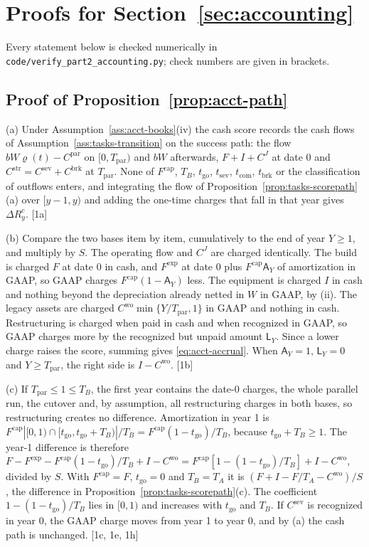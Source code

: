 \section{Proofs for Section~\ref{sec:accounting}}\label{app:proofs-accounting}

Every statement below is checked numerically in \texttt{code/verify\_part2\_accounting.py}; check numbers are given in brackets.

\subsection*{Proof of Proposition~\ref{prop:acct-path}}

(a) Under Assumption~\ref{ass:acct-books}(iv) the cash score records the cash flows of Assumption~\ref{ass:tasks-transition} on the success path: the flow $bW\varrho(t)-C^{\mathrm{par}}$ on $[0,T_{\mathrm{par}})$ and $bW$ afterwards, $F+I+C^J$ at date 0 and $C^{\mathrm{str}}=C^{\mathrm{sev}}+C^{\mathrm{brk}}$ at $T_{\mathrm{par}}$. None of $F^{\mathrm{cap}}$, $T_B$, $t_{\mathrm{go}}$, $t_{\mathrm{sev}}$, $t_{\mathrm{com}}$, $t_{\mathrm{brk}}$ or the classification of outflows enters, and integrating the flow of Proposition~\ref{prop:tasks-scorepath}(a) over $[y-1,y)$ and adding the one-time charges that fall in that year gives $\Delta R^c_y$. [1a]

(b) Compare the two bases item by item, cumulatively to the end of year $Y\ge 1$, and multiply by $S$. The operating flow and $C^J$ are charged identically. The build is charged $F$ at date 0 in cash, and $F^{\mathrm{exp}}$ at date 0 plus $F^{\mathrm{cap}}\mathsf A_Y$ of amortization in GAAP, so GAAP charges $F^{\mathrm{cap}}(1-\mathsf A_Y)$ less. The equipment is charged $I$ in cash and nothing beyond the depreciation already netted in $W$ in GAAP, by (ii). The legacy assets are charged $C^{\mathrm{wo}}\min\{Y/T_{\mathrm{par}},1\}$ in GAAP and nothing in cash. Restructuring is charged when paid in cash and when recognized in GAAP, so GAAP charges more by the recognized but unpaid amount $\mathsf L_Y$. Since a lower charge raises the score, summing gives \eqref{eq:acct-accrual}. When $\mathsf A_Y=1$, $\mathsf L_Y=0$ and $Y\ge T_{\mathrm{par}}$, the right side is $I-C^{\mathrm{wo}}$. [1b]

(c) If $T_{\mathrm{par}}\le 1\le T_B$, the first year contains the date-0 charges, the whole parallel run, the cutover and, by assumption, all restructuring charges in both bases, so restructuring creates no difference. Amortization in year 1 is $F^{\mathrm{cap}}|[0,1)\cap[t_{\mathrm{go}},t_{\mathrm{go}}+T_B)|/T_B=F^{\mathrm{cap}}(1-t_{\mathrm{go}})/T_B$, because $t_{\mathrm{go}}+T_B\ge 1$. The year-1 difference is therefore $F-F^{\mathrm{exp}}-F^{\mathrm{cap}}(1-t_{\mathrm{go}})/T_B+I-C^{\mathrm{wo}}=F^{\mathrm{cap}}[1-(1-t_{\mathrm{go}})/T_B]+I-C^{\mathrm{wo}}$, divided by $S$. With $F^{\mathrm{cap}}=F$, $t_{\mathrm{go}}=0$ and $T_B=T_A$ it is $(F+I-F/T_A-C^{\mathrm{wo}})/S$, the difference in Proposition~\ref{prop:tasks-scorepath}(c). The coefficient $1-(1-t_{\mathrm{go}})/T_B$ lies in $[0,1)$ and increases with $t_{\mathrm{go}}$ and $T_B$. If $C^{\mathrm{sev}}$ is recognized in year 0, the GAAP charge moves from year 1 to year 0, and by (a) the cash path is unchanged. [1c, 1e, 1h]

